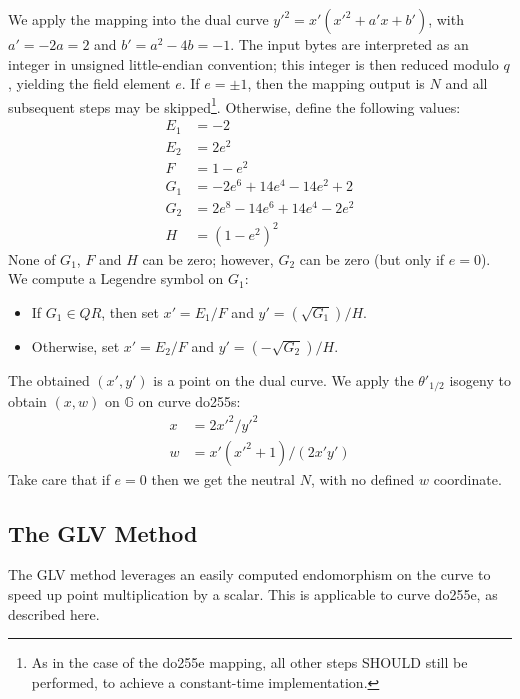 \documentclass{llncs}
\newcommand{\QR}{QR}
\newcommand{\bG}{\mathbb{G}}
\begin{document}
We apply the mapping into the dual curve $y'^2 = x'(x'^2 + a' x + b')$,
with $a' = -2a = 2$ and $b' = a^2-4b = -1$. The input bytes are
interpreted as an integer in unsigned little-endian convention; this
integer is then reduced modulo $q$, yielding the field element $e$. If
$e = \pm 1$, then the mapping output is $N$ and all subsequent steps may be
skipped\footnote{As in the case of the do255e mapping, all other steps
SHOULD still be performed, to achieve a constant-time implementation.}.
Otherwise, define the following values:
\begin{align*}
    E_1 &= -2 \\
    E_2 & = 2e^2 \\
    F &= 1 - e^2 \\
    G_1 &= -2 e^6 + 14 e^4 - 14 e^2 + 2 \\
    G_2 &=  2 e^8 - 14 e^6 + 14 e^4 - 2 e^2 \\
    H &= (1 - e^2)^2
\end{align*}
None of $G_1$, $F$ and $H$ can be zero; however, $G_2$ can be zero (but only
if $e = 0$). We compute a Legendre symbol on $G_1$:
\begin{itemize}
    \item If $G_1 \in \QR$, then set $x' = E_1 / F$ and $y' = (\sqrt{G_1}) / H$.
    \item Otherwise, set $x' = E_2 / F$ and
    $y' = (-\sqrt{G_2}) / H$.
\end{itemize}

The obtained $(x', y')$ is a point on the dual curve. We apply the
$\theta'_{1/2}$ isogeny to obtain $(x, w)$ on $\bG$ on curve do255s:
\begin{align*}
    x &= 2 x'^2 / y'^2 \\
    w &= x'(x'^2 + 1) / (2 x' y')
\end{align*}
Take care that if $e = 0$ then we get the neutral $N$, with no defined
$w$ coordinate.

\subsection{The GLV Method}\label{sec:implementations:glv}

The GLV method\cite{GalLamVan2001} leverages an easily computed endomorphism
on the curve to speed up point multiplication by a scalar. This is
applicable to curve do255e, as described here.
\end{document}
